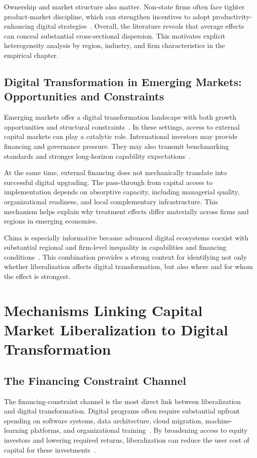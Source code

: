 Ownership and market structure also matter. Non-state firms often face tighter product-market discipline, which can strengthen incentives to adopt productivity-enhancing digital strategies~\cite{Jin2023}. Overall, the literature reveals that average effects can conceal substantial cross-sectional dispersion. This motivates explicit heterogeneity analysis by region, industry, and firm characteristics in the empirical chapter.

\subsection{Digital Transformation in Emerging Markets: Opportunities and Constraints}

Emerging markets offer a digital transformation landscape with both growth opportunities and structural constraints~\cite{Zhao2023}. In these settings, access to external capital markets can play a catalytic role. International investors may provide financing and governance pressure. They may also transmit benchmarking standards and stronger long-horizon capability expectations~\cite{Li2025}.

At the same time, external financing does not mechanically translate into successful digital upgrading. The pass-through from capital access to implementation depends on absorptive capacity, including managerial quality, organizational readiness, and local complementary infrastructure. This mechanism helps explain why treatment effects differ materially across firms and regions in emerging economies.

China is especially informative because advanced digital ecosystems coexist with substantial regional and firm-level inequality in capabilities and financing conditions~\cite{Du2024}. This combination provides a strong context for identifying not only whether liberalization affects digital transformation, but also where and for whom the effect is strongest.

\section{Mechanisms Linking Capital Market Liberalization to Digital Transformation}

\subsection{The Financing Constraint Channel}

The financing-constraint channel is the most direct link between liberalization and digital transformation. Digital programs often require substantial upfront spending on software systems, data architecture, cloud migration, machine-learning platforms, and organizational training~\cite{Kose2003}. By broadening access to equity investors and lowering required returns, liberalization can reduce the user cost of capital for these investments~\cite{LiPang2023}.

